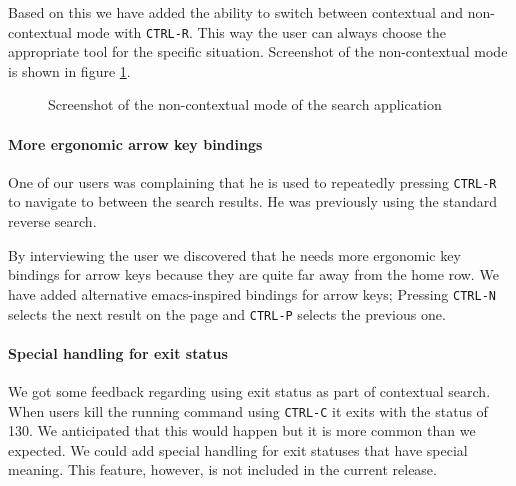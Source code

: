 Based on this we have added the ability to switch between contextual and non-contextual mode with \verb|CTRL-R|. This way the user can always choose the appropriate tool for the specific situation. Screenshot of the non-contextual mode is shown in figure \ref{xterm-resh-raw-80}.

\begin{figure}
\caption{Screenshot of the non-contextual mode of the search application}
\label{xterm-resh-raw-80}
\end{figure}

\paragraph{More ergonomic arrow key bindings}

One of our users was complaining that he is used to repeatedly pressing \verb|CTRL-R| to navigate to between the search results. He was previously using the standard reverse search.

By interviewing the user we discovered that he needs more ergonomic key bindings for arrow keys because they are quite far away from the home row. We have added alternative emacs-inspired bindings for arrow keys; Pressing \verb|CTRL-N| selects the next result on the page and \verb|CTRL-P| selects the previous one.   


\paragraph{Special handling for exit status}

We got some feedback regarding using exit status as part of contextual search. When users kill the running command using \verb|CTRL-C| it exits with the status of 130.
We anticipated that this would happen but it is more common than we expected.
We could add special handling for exit statuses that have special meaning. This feature, however, is not included in the current release.

